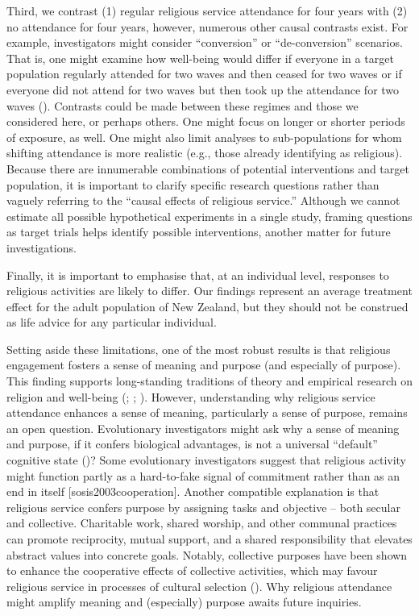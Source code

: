 \documentclass[
  single column]{article}
\begin{document}
Third, we contrast (1) regular religious service attendance for four
years with (2) no attendance for four years, however, numerous other
causal contrasts exist. For example, investigators might consider
``conversion'' or ``de-conversion'' scenarios. That is, one might
examine how well-being would differ if everyone in a target population
regularly attended for two waves and then ceased for two waves or if
everyone did not attend for two waves but then took up the attendance
for two waves (). Contrasts could be made between these regimes and those we
considered here, or perhaps others. One might focus on longer or shorter
periods of exposure, as well. One might also limit analyses to
sub-populations for whom shifting attendance is more realistic (e.g.,
those already identifying as religious). Because there are innumerable
combinations of potential interventions and target population, it is
important to clarify specific research questions rather than vaguely
referring to the ``causal effects of religious service.'' Although we
cannot estimate all possible hypothetical experiments in a single study,
framing questions as target trials helps identify possible
interventions, another matter for future investigations.

Finally, it is important to emphasise that, at an individual level,
responses to religious activities are likely to differ. Our findings
represent an average treatment effect for the adult population of New
Zealand, but they should not be construed as life advice for any
particular individual.

Setting aside these limitations, one of the most robust results is that
religious engagement fosters a sense of meaning and purpose (and
especially of purpose). This finding supports long-standing traditions
of theory and empirical research on religion and well-being
(;
;
).
However, understanding why religious service attendance enhances a sense
of meaning, particularly a sense of purpose, remains an open question.
Evolutionary investigators might ask why a sense of meaning and purpose,
if it confers biological advantages, is not a universal ``default''
cognitive state ()?
Some evolutionary investigators suggest that religious activity might
function partly as a hard-to-fake signal of commitment rather than as an
end in itself {[}sosis2003cooperation{]}. Another compatible explanation
is that religious service confers purpose by assigning tasks and
objective -- both secular and collective. Charitable work, shared
worship, and other communal practices can promote reciprocity, mutual
support, and a shared responsibility that elevates abstract values into
concrete goals. Notably, collective purposes have been shown to enhance
the cooperative effects of collective activities, which may favour
religious service in processes of cultural selection
(). Why
religious attendance might amplify meaning and (especially) purpose
awaits future inquiries.
\end{document}
